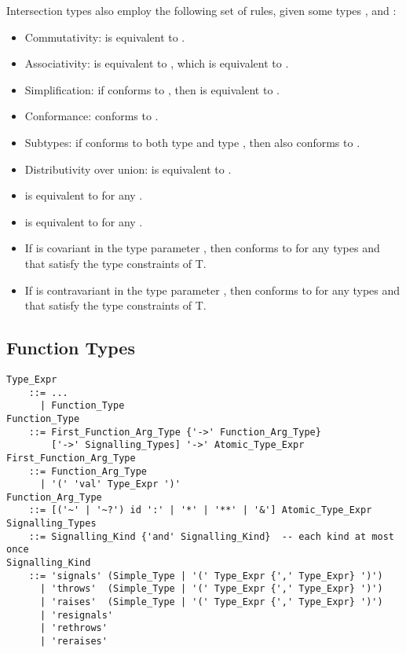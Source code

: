 Intersection types also employ the following set of rules, given some types ,  and :
\begin{itemize}
  \item Commutativity:  is equivalent to . 
  \item Associativity:  is equivalent to , which is equivalent to . 
  \item Simplification: if  conforms to , then  is equivalent to . 
  \item Conformance:  conforms to . 
  \item Subtypes: if  conforms to both type  and type , then  also conforms to . 
  \item Distributivity over union:  is equivalent to . 
  
  \item {} is equivalent to  for any .
  \item {} is equivalent to  for any . 
  
  \item If  is covariant in the type parameter , then  conforms to  for any types  and  that satisfy the type constraints of T. 
  \item If  is contravariant in the type parameter , then  conforms to  for any types  and  that satisfy the type constraints of T. 
\end{itemize}





\subsection{Function Types}
\label{sec:function-types}

\grammar\begin{lstlisting}
Type_Expr
    ::= ...
      | Function_Type
Function_Type 
    ::= First_Function_Arg_Type {'->' Function_Arg_Type}
        ['->' Signalling_Types] '->' Atomic_Type_Expr
First_Function_Arg_Type
    ::= Function_Arg_Type
      | '(' 'val' Type_Expr ')'
Function_Arg_Type
    ::= [('~' | '~?') id ':' | '*' | '**' | '&'] Atomic_Type_Expr
Signalling_Types
    ::= Signalling_Kind {'and' Signalling_Kind}  -- each kind at most once
Signalling_Kind
    ::= 'signals' (Simple_Type | '(' Type_Expr {',' Type_Expr} ')')
      | 'throws'  (Simple_Type | '(' Type_Expr {',' Type_Expr} ')')
      | 'raises'  (Simple_Type | '(' Type_Expr {',' Type_Expr} ')')
      | 'resignals'
      | 'rethrows'
      | 'reraises'
\end{lstlisting}

